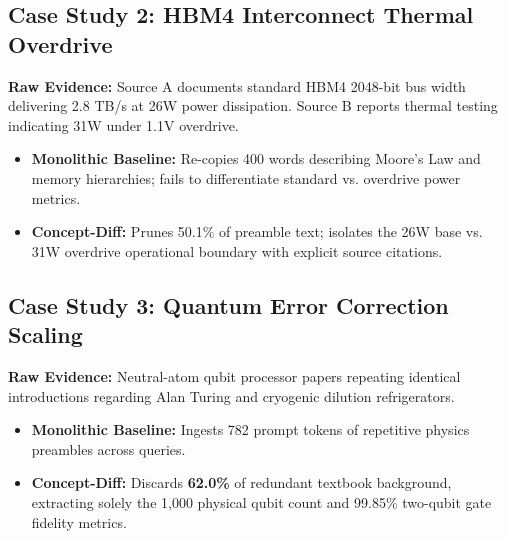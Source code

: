 \documentclass[10pt,twocolumn,letterpaper]{article}
\begin{document}
\subsection{Case Study 2: HBM4 Interconnect Thermal Overdrive}
\textbf{Raw Evidence:} Source A documents standard HBM4 2048-bit bus width delivering 2.8 TB/s at 26W power dissipation. Source B reports thermal testing indicating 31W under 1.1V overdrive.
\begin{itemize}
    \item \textbf{Monolithic Baseline:} Re-copies 400 words describing Moore's Law and memory hierarchies; fails to differentiate standard vs. overdrive power metrics.
    \item \textbf{Concept-Diff:} Prunes 50.1\% of preamble text; isolates the 26W base vs. 31W overdrive operational boundary with explicit source citations.
\end{itemize}

\subsection{Case Study 3: Quantum Error Correction Scaling}
\textbf{Raw Evidence:} Neutral-atom qubit processor papers repeating identical introductions regarding Alan Turing and cryogenic dilution refrigerators.
\begin{itemize}
    \item \textbf{Monolithic Baseline:} Ingests 782 prompt tokens of repetitive physics preambles across queries.
    \item \textbf{Concept-Diff:} Discards \textbf{62.0\%} of redundant textbook background, extracting solely the 1,000 physical qubit count and 99.85\% two-qubit gate fidelity metrics.
\end{itemize}
\end{document}
